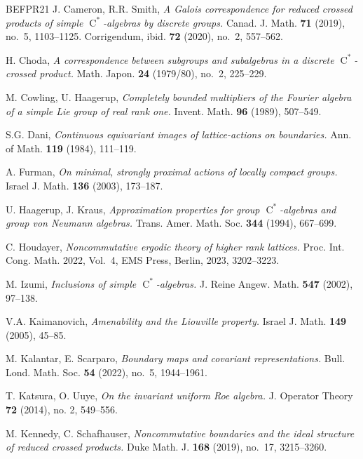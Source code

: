 \documentclass[11pt]{amsart}
\numberwithin{equation}{section}
\newcommand{\rC}{\operatorname{C}}
\theoremstyle{definition}
\begin{document}
\begin{thebibliography}{BEFPR21}
		 {\sc J. Cameron, R.R. Smith}, {\it A Galois correspondence for reduced crossed products of simple $\rC^*$-algebras by discrete groups.} Canad. J. Math. {\bf 71} (2019), no.~5, 1103--1125. Corrigendum, ibid. {\bf 72} (2020), no.~2, 557--562.

		 {\sc H. Choda}, {\it A correspondence between subgroups and subalgebras in a discrete $\rC^*$-crossed product.} Math. Japon. {\bf 24} (1979/80), no.~2, 225--229.
		
		 {\sc M. Cowling, U. Haagerup}, {\it Completely bounded multipliers of the Fourier algebra of a simple Lie group of real rank one.} Invent. Math. {\bf 96} (1989), 507--549.
		
		 {\sc S.G. Dani}, {\it Continuous equivariant images of lattice-actions on boundaries.} Ann. of Math. {\bf 119} (1984), 111--119.
		
		 {\sc A. Furman}, {\it On minimal, strongly proximal actions of locally compact groups.} Israel J. Math. {\bf 136} (2003), 173--187.
		
		 {\sc U. Haagerup, J. Kraus}, {\it Approximation properties for group $\rC^*$-algebras and group von Neumann algebras.} Trans. Amer. Math. Soc. {\bf 344} (1994), 667--699.

		 {\sc C. Houdayer}, {\it Noncommutative ergodic theory of higher rank lattices.} Proc. Int. Cong. Math. 2022, Vol.~4, EMS Press, Berlin, 2023, 3202--3223.

		 {\sc M. Izumi}, {\it Inclusions of simple $\rC^*$-algebras.} J. Reine Angew. Math. {\bf 547} (2002), 97--138.
		
		 {\sc V.A. Kaimanovich}, {\it Amenability and the Liouville property.} Israel J. Math. {\bf 149} (2005), 45--85.

		 {\sc M. Kalantar, E. Scarparo}, {\it Boundary maps and covariant representations.} Bull. Lond. Math. Soc. {\bf 54} (2022), no.~5, 1944--1961.
		
		 {\sc T. Katsura, O. Uuye}, {\it On the invariant uniform Roe algebra.} J. Operator Theory {\bf 72} (2014), no. 2, 549--556.

		 {\sc M. Kennedy, C. Schafhauser}, {\it Noncommutative boundaries and the ideal structure of reduced crossed products.} Duke Math. J. {\bf 168} (2019), no.~17, 3215--3260.


\end{thebibliography}
\end{document}
